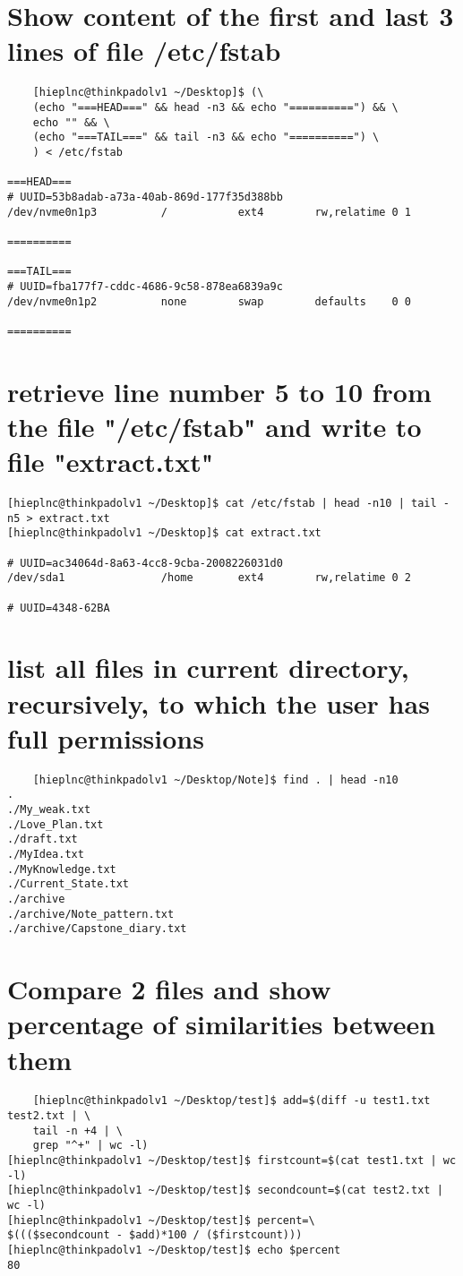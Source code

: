 \documentclass{article}
\begin{document}
	\section{Show content of the first and last 3 lines of file /etc/fstab}
	\begin{verbatim}
	[hieplnc@thinkpadolv1 ~/Desktop]$ (\
	(echo "===HEAD===" && head -n3 && echo "==========") && \
	echo "" && \
	(echo "===TAIL===" && tail -n3 && echo "==========") \
	) < /etc/fstab

===HEAD===
# UUID=53b8adab-a73a-40ab-869d-177f35d388bb
/dev/nvme0n1p3      	/         	ext4      	rw,relatime	0 1

==========

===TAIL===
# UUID=fba177f7-cddc-4686-9c58-878ea6839a9c
/dev/nvme0n1p2      	none      	swap      	defaults  	0 0

==========
	\end{verbatim}

	\section{retrieve line number 5 to 10 from the file "/etc/fstab" and write to file "extract.txt"}
	\begin{verbatim}
[hieplnc@thinkpadolv1 ~/Desktop]$ cat /etc/fstab | head -n10 | tail -n5 > extract.txt
[hieplnc@thinkpadolv1 ~/Desktop]$ cat extract.txt

# UUID=ac34064d-8a63-4cc8-9cba-2008226031d0
/dev/sda1           	/home     	ext4      	rw,relatime	0 2

# UUID=4348-62BA
	\end{verbatim}

	\section{list all files in current directory, recursively, to which the user has full permissions}
	\begin{verbatim}
	[hieplnc@thinkpadolv1 ~/Desktop/Note]$ find . | head -n10
.
./My_weak.txt
./Love_Plan.txt
./draft.txt
./MyIdea.txt
./MyKnowledge.txt
./Current_State.txt
./archive
./archive/Note_pattern.txt
./archive/Capstone_diary.txt
	\end{verbatim}

	\section{Compare 2 files and show percentage of similarities between them}
	\begin{verbatim}
	[hieplnc@thinkpadolv1 ~/Desktop/test]$ add=$(diff -u test1.txt test2.txt | \
	tail -n +4 | \
	grep "^+" | wc -l)
[hieplnc@thinkpadolv1 ~/Desktop/test]$ firstcount=$(cat test1.txt | wc -l)
[hieplnc@thinkpadolv1 ~/Desktop/test]$ secondcount=$(cat test2.txt | wc -l)
[hieplnc@thinkpadolv1 ~/Desktop/test]$ percent=\
$((($secondcount - $add)*100 / ($firstcount)))
[hieplnc@thinkpadolv1 ~/Desktop/test]$ echo $percent
80
	\end{verbatim}
\end{document}
